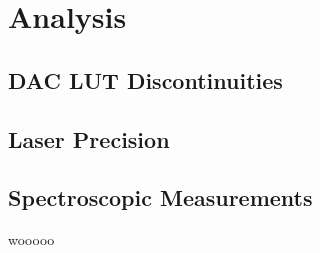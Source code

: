 \documentclass[../main]{subfiles}
\begin{document}
\chapter{Analysis}
\section*{DAC LUT Discontinuities}
\section*{Laser Precision}
\section*{Spectroscopic Measurements}

wooooo
\end{document}
